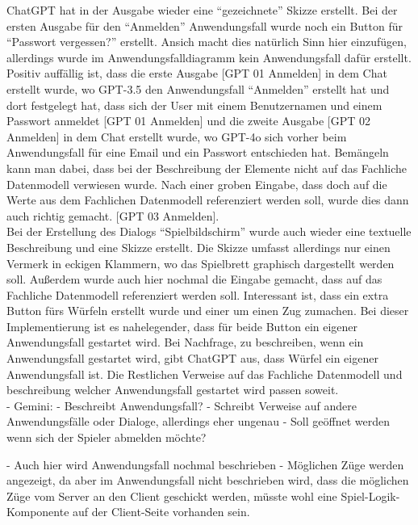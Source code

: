 ChatGPT hat in der Ausgabe wieder eine ``gezeichnete'' Skizze erstellt. Bei der ersten Ausgabe für den ``Anmelden'' Anwendungsfall wurde
noch ein Button für ``Passwort vergessen?'' erstellt. Ansich macht dies natürlich Sinn hier einzufügen, allerdings wurde im Anwendungsfalldiagramm
kein Anwendungsfall dafür erstellt. Positiv auffällig ist, dass die erste Ausgabe [GPT 01 Anmelden] in dem Chat erstellt wurde, wo GPT-3.5 
den Anwendungsfall ``Anmelden'' erstellt hat und dort festgelegt hat, dass sich der User mit einem Benutzernamen und einem Passwort anmeldet [GPT 01 Anmelden]
und die zweite Ausgabe [GPT 02 Anmelden] in dem Chat erstellt wurde, wo GPT-4o sich vorher beim Anwendungsfall für eine Email und ein Passwort 
entschieden hat. Bemängeln kann man dabei, dass bei der Beschreibung der Elemente nicht auf das Fachliche Datenmodell verwiesen wurde. Nach einer 
groben Eingabe, dass doch auf die Werte aus dem Fachlichen Datenmodell referenziert werden soll, wurde dies dann auch richtig gemacht. [GPT 03 Anmelden].\\
Bei der Erstellung des Dialogs ``Spielbildschirm'' wurde auch wieder eine textuelle Beschreibung und eine Skizze erstellt. Die Skizze umfasst
allerdings nur einen Vermerk in eckigen Klammern, wo das Spielbrett graphisch dargestellt werden soll. Außerdem wurde auch hier nochmal die Eingabe 
gemacht, dass auf das Fachliche Datenmodell referenziert werden soll. Interessant ist, dass ein extra Button fürs Würfeln erstellt wurde und einer um 
einen Zug zumachen. Bei dieser Implementierung ist es nahelegender, dass für beide Button ein eigener Anwendungsfall gestartet wird. Bei Nachfrage, zu 
beschreiben, wenn ein Anwendungsfall gestartet wird, gibt ChatGPT aus, dass Würfel ein eigener Anwendungsfall ist. Die Restlichen Verweise auf das 
Fachliche Datenmodell und beschreibung welcher Anwendungsfall gestartet wird passen soweit.\\

- Gemini:
    - Beschreibt Anwendungsfall?
    - Schreibt Verweise auf andere Anwendungsfälle oder Dialoge, allerdings eher ungenau
    - Soll geöffnet werden wenn sich der Spieler abmelden möchte?

    - Auch hier wird Anwendungsfall nochmal beschrieben
    - Möglichen Züge werden angezeigt, da aber im Anwendungsfall nicht beschrieben wird, dass die möglichen Züge vom Server an den Client
    geschickt werden, müsste wohl eine Spiel-Logik-Komponente auf der Client-Seite vorhanden sein.

